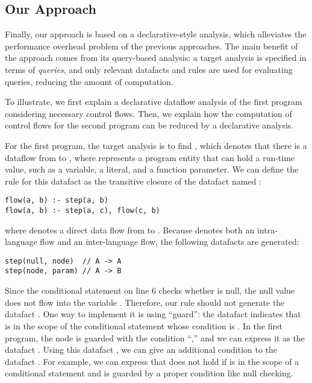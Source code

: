 \subsection{Our Approach}

Finally, our approach is based on a declarative-style analysis, which
alleviates the performance overhead problem of the previous approaches.
The main benefit of the approach comes from its query-based analysis:
a target analysis is
specified in terms of \textit{queries}, and only relevant datafacts and rules
are used for evaluating queries, reducing the amount of computation.

To illustrate, we first explain a declarative dataflow analysis of the
first program considering necessary control flows. Then, we explain
how the computation of control flows for the second program can be
reduced by a declarative analysis.

For the first program, the target analysis is to find ,
which denotes that there is a dataflow from  to ,
where  represents a program entity that can hold a run-time
value, such as a variable, a literal, and a function parameter.
We can define the rule for this datafact as the transitive closure of
the datafact named :
\begin{lstlisting}[style=myDatalog,xleftmargin=2.5em]
flow(a, b) :- step(a, b)
flow(a, b) :- step(a, c), flow(c, b)
\end{lstlisting}
where  denotes a direct data
flow from  to .
Because  denotes both an intra-language flow and an inter-language flow,
the following datafacts are generated:
\begin{lstlisting}[style=myDatalog,xleftmargin=2.5em]
step(null, node)  // A -> A
step(node, param) // A -> B
\end{lstlisting}
Since the conditional statement on line 6 checks whether 
is null, the null value does not flow into the variable .
Therefore, our rule should not generate the datafact .
One way to implement it is using ``guard'': the datafact 
indicates that  is in the scope of the conditional
statement whose condition is .
In the first program, the  node is guarded with the condition
``,'' and we can express it as the datafact
.
Using this datafact , we can give an additional condition to the
datafact . For example, we can express that
 does not hold if  is in the scope of
a conditional statement and is guarded by a proper condition like null checking.

